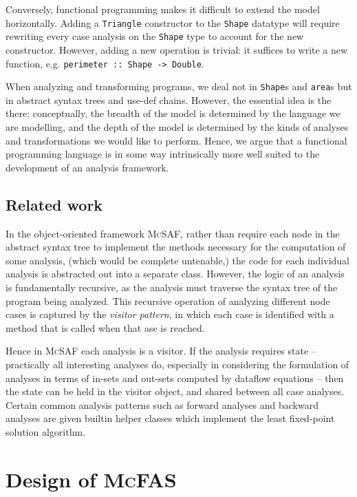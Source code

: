\documentclass[letterpaper,11pt]{article}
\newcommand{\mcfas}{\textsc{McFAS}}
\newcommand{\mcsaf}{\textsc{McSAF}}
\newcommand{\code}{\texttt}
\begin{document}
Conversely, functional programming makes it difficult to extend the model
horizontally. Adding a \code{Triangle} constructor to the \code{Shape}
datatype will require rewriting every case analysis on the \code{Shape}
type to account for the new constructor. However, adding a new operation is
trivial: it suffices to write a new function, e.g.
\code{perimeter :: Shape -> Double}.

When analyzing and transforming programs, we deal not in \code{Shape}s and
\code{area}s but in abstract syntax trees and use-def chains. However, the
essential idea is the there: conceptually, the breadth of the model is
determined by the language we are modelling, and the depth of the model is
determined by the kinds of analyses and transformations we would like to
perform. Hence, we argue that a functional programming language is in some way
intrinsically more well suited to the development of an analysis framework.

\subsection{Related work}

In the object-oriented framework \mcsaf\cite{mcsaf}, rather than require each
node in the abstract syntax tree to implement the methods necessary for the
computation of some analysis, (which would be complete untenable,) the code for
each individual analysis is abstracted out into a separate class. However, the
logic of an analysis is fundamentally recursive, as the analysis must traverse
the syntax tree of the program being analyzed. This recursive operation of
analyzing different node cases is captured by the \emph{visitor pattern}, in
which each case is identified with a method that is called when that ase is
reached.

Hence in \mcsaf{} each analysis is a visitor. If the analysis requires state --
practically all interesting analyses do, especially in considering the
formulation of analyses in terms of in-sets and out-sets computed by dataflow
equations -- then the state can be held in the visitor object, and shared
between all case analyses. Certain common analysis patterns such as forward
analyses and backward analyses are given builtin helper classes which
implement the least fixed-point solution algorithm.

\section{Design of \mcfas{}} \label{sec:design}
\end{document}
